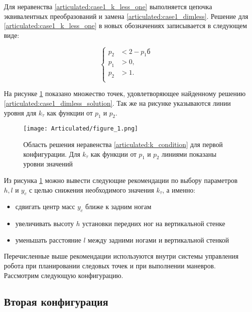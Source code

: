 Для неравенства \ref{articulated:case1_k_less_one} выполняется цепочка эквивалентных преобразований и замена \ref{articulated:case1_dimless}. Решение для \ref{articulated:case1_k_less_one} в новых обозначениях записывается в следующем виде:

\begin{equation}
\label{articulated:case1_dimless_solution}
\left\{
  \begin{alignedat}{2}
    p_2 &< 2 - p_1б\\
    p_1 &> 0,\\
    p_2 &> 1.\\
  \end{alignedat}
\right.
\end{equation}

На рисунке \ref{articulated:fig:case1_dimless_solution} показано множество точек, удовлетворяющее найденному решению \ref{articulated:case1_dimless_solution}. Так же на рисунке указываются линии уровня для $k_\tau$ как функции от $p_1$ и $p_2$.

\begin{figure}[ht]
  \centering
  \texttt{[image: Articulated/figure\_1.png]}
  \caption{Область решения неравенства \ref{articulated:k_condition} для первой конфигурации. Для $k_\tau$ как функции от $p_1$ и $p_2$ линиями показаны уровни значений}
  \label{articulated:fig:case1_dimless_solution}
\end{figure}

Из рисунка \ref{articulated:fig:case1_dimless_solution} можно вывести следующие рекомендации по выбору параметров $h,l$ и $y_c$ с целью снижения необходимого значения $k_\tau$, а именно:

\begin{itemize}
  \item сдвигать центр масс $y_c$ ближе к задним ногам
  \item увеличивать высоту $h$ установки передних ног на вертикальной стенке
  \item уменьшать расстояние $l$ между задними ногами и вертикальной стенкой
\end{itemize}

Перечисленные выше рекомендации используются внутри системы управления робота при планировании следовых точек и при выполнении маневров. Рассмотрим следующую конфигурацию.



\subsection{Вторая конфигурация}
\label{articulated:case_2}

